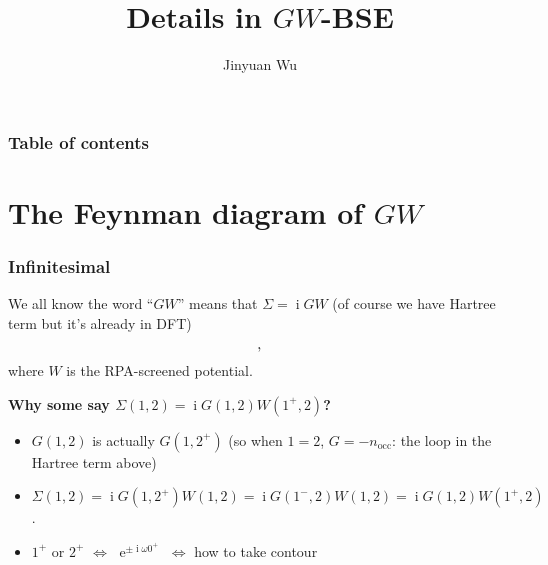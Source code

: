 \documentclass[t]{beamer}
\title{Details in $GW$-BSE}
\author{Jinyuan Wu}
\DeclareMathOperator{\ee}{e}
\DeclareMathOperator{\ii}{i}
\begin{document}
\maketitle

\begin{frame}
    \frametitle{Table of contents}

    \tableofcontents

\end{frame}

\section{The Feynman diagram of $GW$}

\begin{frame}
\frametitle{Infinitesimal}

We all know the word ``$GW$'' means that $\Sigma = \ii G W$ 
(of course we have Hartree term but it's already in DFT)

\begin{equation}
    \protect,
\end{equation}
where $W$ is the RPA-screened potential.

\vspace{0.25cm}
\textbf{Why some say $\Sigma(1, 2) = \ii G(1, 2) W(1^+, 2)$?}

\begin{itemize}
    \item $G(1, 2)$ is actually $G(1, 2^+)$ (so when $1=2$, $G =- n_{\text{occ}}$: 
    the loop in the Hartree term above)
    \item $\Sigma(1, 2) = \ii G(1, 2^+) W(1, 2) = \ii G(1^-, 2) W(1, 2) = \ii G(1, 2) W(1^+, 2)$.
    \item $1^+$ or $2^+$ $\Leftrightarrow$ $\ee^{\pm \ii \omega 0^+}$
        $\Leftrightarrow$ how to take contour 
\end{itemize}

\end{frame}
\end{document}
